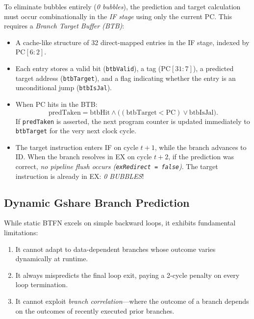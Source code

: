 To eliminate bubbles entirely (\textit{0 bubbles}), the prediction and target calculation must occur combinationally in the \textit{\textsc{IF} stage} using only the current $\text{PC}$. This requires a \textit{Branch Target Buffer (BTB)}:
\begin{itemize}
    \item A cache-like structure of 32 direct-mapped entries in the \textsc{IF} stage, indexed by $\text{PC}[6:2]$.
    \item Each entry stores a valid bit (\texttt{btbValid}), a tag ($\text{PC}[31:7]$), a predicted target address (\texttt{btbTarget}), and a flag indicating whether the entry is an unconditional jump (\texttt{btbIsJal}).
    \item When $\text{PC}$ hits in the BTB:
    \begin{equation}
    \text{predTaken} = \text{btbHit} \land \bigl((\text{btbTarget} < \text{PC}) \lor \text{btbIsJal}\bigr).
    \end{equation}
    If \texttt{predTaken} is asserted, the next program counter is updated immediately to \texttt{btbTarget} for the very next clock cycle.
    \item The target instruction enters \textsc{IF} on cycle $t+1$, while the branch advances to \textsc{ID}. When the branch resolves in \textsc{EX} on cycle $t+2$, if the prediction was correct, \textit{no pipeline flush occurs (\texttt{exRedirect = false})}. The target instruction is already in \textsc{EX}: \textit{0 BUBBLES}!
\end{itemize}

\subsection{Dynamic Gshare Branch Prediction}

While static BTFN excels on simple backward loops, it exhibits fundamental limitations:
\begin{enumerate}
    \item It cannot adapt to data-dependent branches whose outcome varies dynamically at runtime.
    \item It always mispredicts the final loop exit, paying a 2-cycle penalty on every loop termination.
    \item It cannot exploit \textit{branch correlation}---where the outcome of a branch depends on the outcomes of recently executed prior branches.
\end{enumerate}

